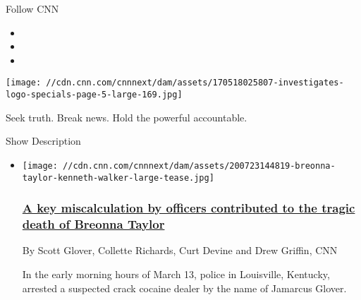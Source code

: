 Follow CNN

\begin{itemize}
\item
\item
\item
\end{itemize}

\texttt{[image: //cdn.cnn.com/cnnnext/dam/assets/170518025807-investigates-logo-specials-page-5-large-169.jpg]}

Seek truth. Break news. Hold the powerful accountable.

Show Description

\begin{itemize}
\item
  \href{/2020/07/23/us/breonna-taylor-police-shooting-invs/index.html}{}

  \texttt{[image: //cdn.cnn.com/cnnnext/dam/assets/200723144819-breonna-taylor-kenneth-walker-large-tease.jpg]}

  \hypertarget{a-key-miscalculation-by-officers-contributed-to-the-tragic-death-of-breonna-taylor}{%
  \subsubsection{\texorpdfstring{\href{/2020/07/23/us/breonna-taylor-police-shooting-invs/index.html}{A
  key miscalculation by officers contributed to the tragic death of
  Breonna
  Taylor}}{A key miscalculation by officers contributed to the tragic death of Breonna Taylor}}\label{a-key-miscalculation-by-officers-contributed-to-the-tragic-death-of-breonna-taylor}}

  By Scott Glover, Collette Richards, Curt Devine and Drew Griffin, CNN

  In the early morning hours of March 13, police in Louisville,
  Kentucky, arrested a suspected crack cocaine dealer by the name of
  Jamarcus Glover.
\end{itemize}

